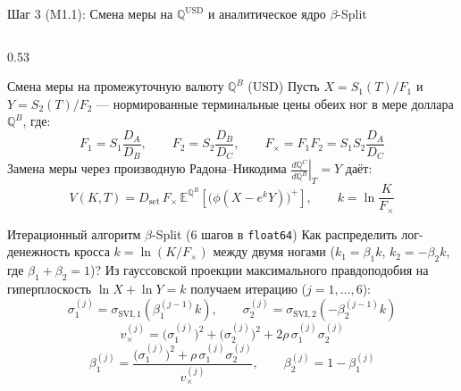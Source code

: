 \documentclass[aspectratio=169, 9pt]{beamer}
\begin{document}
\begin{frame}{Шаг 3 (M1.1): Смена меры на $\mathbb{Q}^{\text{USD}}$ и аналитическое ядро $\beta$-Split}
  \begin{columns}[T]
    \begin{column}{0.53\textwidth}
      \begin{block}{Смена меры на промежуточную валюту $\mathbb{Q}^B$ ($\text{USD}$)}
        Пусть $X = S_1(T)/F_1$ и $Y = S_2(T)/F_2$ --- нормированные терминальные цены обеих ног в мере доллара $\mathbb{Q}^B$, где:
        $$F_1 = S_1 \frac{D_A}{D_B}, \qquad F_2 = S_2 \frac{D_B}{D_C}, \qquad F_\times = F_1 F_2 = S_1 S_2 \frac{D_A}{D_C}$$
        Замена меры через производную Радона--Никодима $\left.\frac{d\mathbb{Q}^C}{d\mathbb{Q}^B}\right|_T = Y$ даёт:
        $$V(K, T) = D_{\text{set}}\, F_\times\, \mathbb{E}^{\mathbb{Q}^B}\!\left[\big(\phi(X - e^k Y)\big)^+\right], \qquad k = \ln\!\frac{K}{F_\times}$$
      \end{block}

      \begin{block}{Итерационный алгоритм $\beta$-Split (6 шагов в \texttt{float64})}
        Как распределить лог-денежность кросса $k = \ln(K/F_\times)$ между двумя ногами ($k_1 = \beta_1 k$, $k_2 = -\beta_2 k$, где $\beta_1 + \beta_2 = 1$)?
        Из гауссовской проекции максимального правдоподобия на гиперплоскость $\ln X + \ln Y = k$ получаем итерацию ($j = 1, \dots, 6$):
        $$\sigma_{1}^{(j)} = \sigma_{\text{SVI},1}\!\left(\beta_1^{(j-1)} k\right), \qquad
          \sigma_{2}^{(j)} = \sigma_{\text{SVI},2}\!\left(-\beta_2^{(j-1)} k\right)$$
        $$v_\times^{(j)} = \big(\sigma_1^{(j)}\big)^2 + \big(\sigma_2^{(j)}\big)^2 + 2\rho\,\sigma_1^{(j)}\sigma_2^{(j)}$$
        $$\beta_1^{(j)} = \frac{\big(\sigma_1^{(j)}\big)^2 + \rho\,\sigma_1^{(j)}\sigma_2^{(j)}}{v_\times^{(j)}}, \qquad \beta_2^{(j)} = 1 - \beta_1^{(j)}$$
      \end{block}
    \end{column}


\end{columns}
\end{frame}
\end{document}

